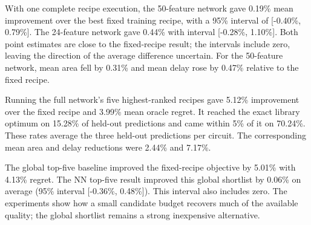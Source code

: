With one complete recipe execution, the 50-feature network gave 0.19\% mean improvement over the best fixed training recipe, with a 95\% interval of [-0.40\%, 0.79\%]. The 24-feature network gave 0.44\% with interval [-0.28\%, 1.10\%]. Both point estimates are close to the fixed-recipe result; the intervals include zero, leaving the direction of the average difference uncertain. For the 50-feature network, mean area fell by 0.31\% and mean delay rose by 0.47\% relative to the fixed recipe.

Running the full network's five highest-ranked recipes gave 5.12\% improvement over the fixed recipe and 3.99\% mean oracle regret. It reached the exact library optimum on 15.28\% of held-out predictions and came within 5\% of it on 70.24\%. These rates average the three held-out predictions per circuit. The corresponding mean area and delay reductions were 2.44\% and 7.17\%.

The global top-five baseline improved the fixed-recipe objective by 5.01\% with 4.13\% regret. The NN top-five result improved this global shortlist by 0.06\% on average (95\% interval [-0.36\%, 0.48\%]). This interval also includes zero. The experiments show how a small candidate budget recovers much of the available quality; the global shortlist remains a strong inexpensive alternative.
